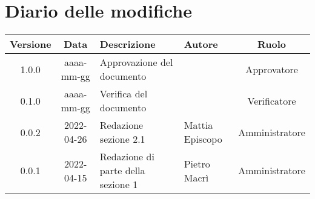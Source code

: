 \section*{Diario delle modifiche}
	\begin{center}
	\renewcommand{\arraystretch}{1.8} %
	\begin{tabular}{ |c|c|m{12em}|m{7em}|c| }
		\hline
		\textbf{Versione} & \textbf{Data} & \textbf{Descrizione} &  \textbf{Autore} &  \textbf{Ruolo} \\
		\hline
		1.0.0 & aaaa-mm-gg & Approvazione del documento & \docApprovazione & Approvatore\\
		\hline
		0.1.0 & aaaa-mm-gg & Verifica del documento & \docVerificatori & Verificatore\\
		\hline
		0.0.2 & 2022-04-26 & Redazione sezione 2.1 & Mattia \newline Episcopo & Amministratore\\
		\hline
		0.0.1 & 2022-04-15 & Redazione di parte della sezione 1 & Pietro Macrì & Amministratore\\
		\hline
	\end{tabular}
	\end{center}
	\newpage